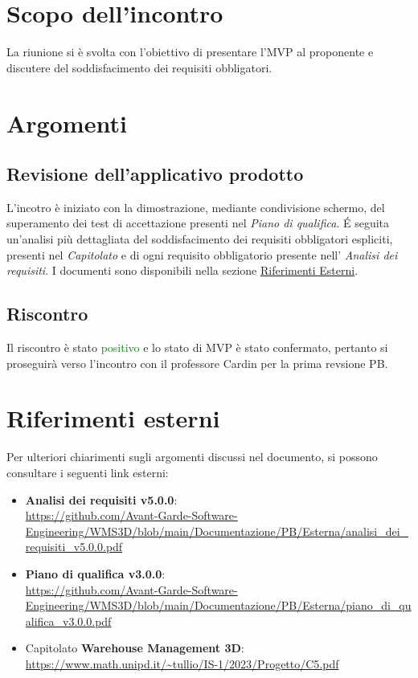 \section{Scopo dell'incontro} \label{sec:scopo}
La riunione si è svolta con l'obiettivo di presentare l'MVP al proponente e discutere del soddisfacimento dei requisiti obbligatori.

\section{Argomenti} \label{sec:argomenti}
\subsection{Revisione dell'applicativo prodotto}
L'incotro è iniziato con la dimostrazione, mediante condivisione schermo, del superamento dei test di accettazione presenti nel \textit{Piano di qualifica}.
É seguita un'analisi più dettagliata del soddisfacimento dei requisiti obbligatori espliciti, presenti nel \textit{Capitolato} e di ogni requisito obbligatorio presente nell' \textit{Analisi dei requisiti}. I documenti sono disponibili nella sezione \hyperref[sec:riferimenti_esterni]{Riferimenti Esterni}.
\subsection{Riscontro}
Il riscontro è stato \textcolor{green}{positivo} e lo stato di MVP è stato confermato, pertanto si proseguirà verso l'incontro con il professore Cardin per la prima revsione PB.


\newpage
\section{Riferimenti esterni} \label{sec:riferimenti_esterni}
Per ulteriori chiarimenti sugli argomenti discussi nel documento, si possono consultare i seguenti link esterni:
\begin{itemize}
    \item \textbf{Analisi dei requisiti v5.0.0}:\\
    \url{https://github.com/Avant-Garde-Software-Engineering/WMS3D/blob/main/Documentazione/PB/Esterna/analisi_dei_requisiti_v5.0.0.pdf}
    \item \textbf{Piano di qualifica v3.0.0}:\\
    \url{https://github.com/Avant-Garde-Software-Engineering/WMS3D/blob/main/Documentazione/PB/Esterna/piano_di_qualifica_v3.0.0.pdf}
    \item Capitolato \textbf{Warehouse Management 3D}:\\
    \url{https://www.math.unipd.it/~tullio/IS-1/2023/Progetto/C5.pdf}
\end{itemize}